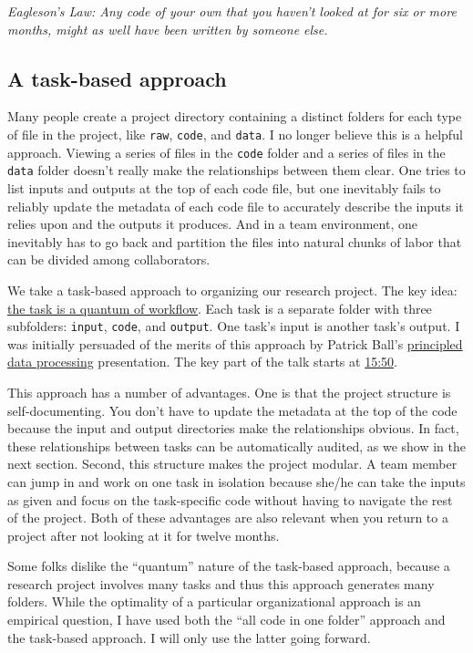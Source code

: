 \noindent \textit{Eagleson's Law: Any code of your own that you haven't looked at for six or more months, might as well have been written by someone else.}

\subsection{A task-based approach}

Many people create a project directory containing a distinct folders for each type of file in the project, like \texttt{raw}, \texttt{code}, and \texttt{data}.
I no longer believe this is a helpful approach.
Viewing a series of files in the \texttt{code} folder and a series of files in the \texttt{data} folder doesn't really make the relationships between them clear.
One tries to list inputs and outputs at the top of each code file,
but one inevitably fails to reliably update the metadata of each code file to accurately describe the inputs it relies upon and the outputs it produces.
And in a team environment, one inevitably has to go back and partition the files into natural chunks of labor that can be divided among collaborators.

We take a task-based approach to organizing our research project.
The key idea: \href{https://hrdag.org/2016/06/14/the-task-is-a-quantum-of-workflow/}{the task is a quantum of workflow}. 
Each task is a separate folder with three subfolders: \texttt{input}, \texttt{code}, and \texttt{output}.
One task's input is another task's output.
I was initially persuaded of the merits of this approach by Patrick Ball's \href{https://www.youtube.com/watch?v=ZSunU9GQdcI}{principled data processing} presentation.
The key part of the talk starts at \href{https://youtu.be/ZSunU9GQdcI?t=15m50s}{15:50}.

This approach has a number of advantages.
One is that the project structure is self-documenting.
You don't have to update the metadata at the top of the code because the input and output directories make the relationships obvious.
In fact, these relationships between tasks can be automatically audited, 
as we show in the next section.
Second, this structure makes the project modular.
A team member can jump in and work on one task in isolation because she/he can take the inputs as given and focus on the task-specific code without having to navigate the rest of the project.
Both of these advantages are also relevant when you return to a project after not looking at it for twelve months.

Some folks dislike the ``quantum'' nature of the task-based approach,
because a research project involves many tasks and thus this approach generates many folders.
While the optimality of a particular organizational approach is an empirical question,
I have used both the ``all code in one folder'' approach and the task-based approach.
I will only use the latter going forward.

